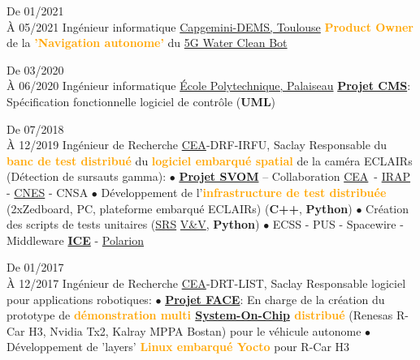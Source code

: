 \documentclass[
	a4paper,
	subsectioncolor=cvblue!70,
]{fortysecondscv}
\newcommand{\cea}{\href{http://www.cea.fr/}{CEA}}
\newcommand{\ice}{\href{https://zeroc.com/products/ice}{ICE}}
\newcommand{\hl}[1]{\textbf{\textcolor{orange}{#1}}}
\begin{document}
\begin{cvtable}[2]
  \cvitem
      {De 01/2021\\À 05/2021}
      {Ingénieur informatique}
      {\href{https://www.capgemini.com/service/digital-services/digital-engineering-and-manufacturing-services/}{Capgemini-DEMS,
      Toulouse}}
  {
    \hl{Product Owner} de la \hl{'Navigation autonome'} du
    \href{https://www.capgemini.com/fr-fr/solutions/5g-water-clean-bot/}{5G
      Water Clean Bot}
  }

  \cvitem
      {De 03/2020\\À 06/2020}
      {Ingénieur informatique}
      {\href{https://www.polytechnique.edu/fr/le-laboratoire-leprince-ringuet-llr}{École
      Polytechnique, Palaiseau}}
  {
    \textbf{\href{http://polywww.in2p3.fr/-cms-45-?lang=fr}{Projet CMS}}:
    Spécification fonctionnelle logiciel de contrôle (\textbf{UML})
  }

  \cvitem
      {De 07/2018\\À 12/2019}
      {Ingénieur de Recherche}
      {\cea-DRF-IRFU, Saclay}
  {
    Responsable du \hl{banc de test distribué} du \hl{logiciel embarqué spatial} de la
    caméra ECLAIRs (Détection de sursauts gamma):
    \newline $\bullet$ {
      \hl{\href{http://www.svom.fr/}{Projet SVOM}} -- Collaboration
      \cea\ - \href{http://www.irap.omp.eu/}{IRAP} -
      \href{https://cnes.fr/fr}{CNES} - CNSA
    }
    \newline $\bullet$ {
      Développement de l'\hl{infrastructure de test distribuée} (2xZedboard, PC,
      plateforme embarqué ECLAIRs) (\textbf{C++}, \textbf{Python})
    }
    \newline $\bullet$ {
      Création des scripts de tests unitaires
      (\href{https://en.wikipedia.org/wiki/Software_requirements_specification}{SRS}
      \href{https://en.wikipedia.org/wiki/Software_verification_and_validation}{V\&V},
      \textbf{Python})
    }
    \newline $\bullet$ {
      ECSS - PUS - Spacewire - Middleware
      \textbf{\ice} -
      \href{https://www.plm.automation.siemens.com/global/en/products/polarion/}{Polarion}
    }
  }

  \cvitem
      {De 01/2017\\À 12/2017}
      {Ingénieur de Recherche}
      {\cea-DRT-LIST, Saclay}
  {
    Responsable logiciel pour applications robotiques:
    \newline $\bullet$ {
      \textbf{\href{https://www.designspot.fr/portfolio/face/}{Projet FACE}}: En
      charge de la création du prototype de \hl{démonstration multi
        \href{https://en.wikipedia.org/wiki/System_on_a_chip}{System-On-Chip}
        distribué} (Renesas R-Car H3, Nvidia Tx2, Kalray MPPA Bostan) pour
      le véhicule autonome
    }
    \newline $\bullet$ {
      Développement de 'layers' \hl{Linux embarqué Yocto} pour R-Car H3
    }
  }


\end{cvtable}
\end{document}

